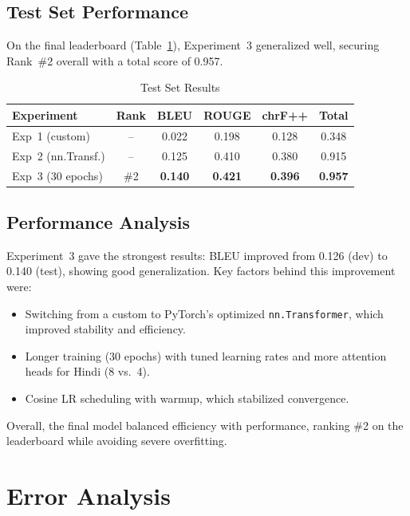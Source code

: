 \documentclass[11pt, oneside]{article}   	%
\begin{document}
\subsection{Test Set Performance}
On the final leaderboard (Table~\ref{tab:test_results}), Experiment~3 generalized well, securing Rank~\#2 overall with a total score of 0.957.

\begin{table}[h]
\centering
\caption{Test Set Results}
\label{tab:test_results}
\begin{tabular}{|l|c|c|c|c|c|}
\hline
\textbf{Experiment} & \textbf{Rank} & \textbf{BLEU} & \textbf{ROUGE} & \textbf{chrF++} & \textbf{Total} \\
\hline
Exp~1 (custom)  & -- & 0.022 & 0.198 & 0.128 & 0.348 \\
Exp~2 (nn.Transf.) & -- & 0.125 & 0.410 & 0.380 & 0.915 \\
Exp~3 (30 epochs) & \#2 & \textbf{0.140} & \textbf{0.421} & \textbf{0.396} & \textbf{0.957} \\
\hline
\end{tabular}
\end{table}

\subsection{Performance Analysis}
Experiment~3 gave the strongest results: BLEU improved from 0.126 (dev) to 0.140 (test), showing good generalization.  
Key factors behind this improvement were:  
\begin{itemize}
    \item Switching from a custom to PyTorch’s optimized \texttt{nn.Transformer}, which improved stability and efficiency.  
    \item Longer training (30 epochs) with tuned learning rates and more attention heads for Hindi (8 vs.\ 4).  
    \item Cosine LR scheduling with warmup, which stabilized convergence.  
\end{itemize}
Overall, the final model balanced efficiency with performance, ranking \#2 on the leaderboard while avoiding severe overfitting.


\section{Error Analysis}
\end{document}
